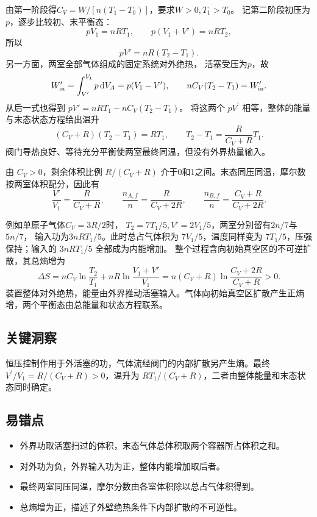 \documentclass[UTF8,fontset=fandol,a4paper,11pt]{ctexart}
\newcommand{\dd}{\mathop{}\!\mathrm{d}}
\begin{document}
由第一阶段得$C_V=W/[n(T_1-T_0)]$，要求$W>0,T_1>T_0$。
记第二阶段初压为$p$，逐步比较初、末平衡态：
\[
pV_1=nRT_1,\qquad p(V_1+V')=nRT_2,
\]
所以
\[
pV'=nR(T_2-T_1).
\]
另一方面，两室全部气体组成的固定系统对外绝热，
活塞受压为$p$，故
\[
W'_{\rm in}=\int_{V'}^{V_1}p\dd V_A=p(V_1-V'),
\qquad nC_V(T_2-T_1)=W'_{\rm in}.
\]
从后一式也得到
$pV'=nRT_1-nC_V(T_2-T_1)$。
将这两个 $pV^{\prime}$ 相等，整体的能量与末态状态方程给出温升
\[
(C_V+R)(T_2-T_1)=RT_1,\qquad
T_2-T_1=\frac{R}{C_V+R}T_1.
\]
阀门导热良好、等待充分平衡使两室最终同温，但没有外界热量输入。

由 $C_V>0$，剩余体积比例 $R/(C_V+R)$ 介于0和1之间。末态同压同温，摩尔数按两室体积配分，因此有
\[
\frac{V'}{V_1}=\frac{R}{C_V+R},\qquad
\frac{n_{A,f}}n=\frac{R}{C_V+2R},\qquad
\frac{n_{B,f}}n=\frac{C_V+R}{C_V+2R}.
\]


例如单原子气体$C_V=3R/2$时，
$T_2=7T_1/5,V'=2V_1/5$，两室分别留有$2n/7$与$5n/7$，
输入功为$3nRT_1/5$。此时总占气体积为 $7V_1/5$，温度同样变为 $7T_1/5$，压强保持；输入的 $3nRT_1/5$ 全部成为内能增加。
整个过程含向初始真空区的不可逆扩散，其总熵增为
\[
\Delta S=nC_V\ln\frac{T_2}{T_1}
+nR\ln\frac{V_1+V'}{V_1}
=n(C_V+R)\ln\frac{C_V+2R}{C_V+R}>0.
\]
装置整体对外绝热，能量由外界推动活塞输入。气体向初始真空区扩散产生正熵增，两个平衡态由总能量和状态方程联系。




\subsection*{关键洞察}

恒压控制作用于外活塞的功，气体流经阀门的内部扩散另产生熵。最终 $V^{\prime}/V_1=R/(C_V+R)>0$，温升为 $RT_1/(C_V+R)$，二者由整体能量和末态状态同时确定。



\subsection*{易错点}

\begin{itemize}
\item 外界功取活塞扫过的体积，末态气体总体积取两个容器所占体积之和。
\item 对外功为负，外界输入功为正，整体内能增加取后者。
\item 最终两室同压同温，摩尔分数由各室体积除以总占气体积得到。
\item 总熵增为正，描述了外壁绝热条件下内部扩散的不可逆性。
\end{itemize}
\end{document}
